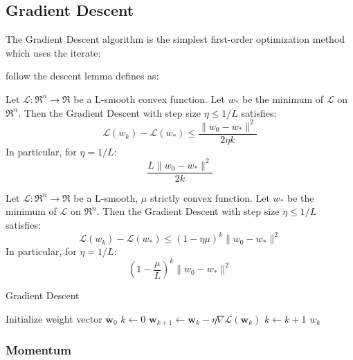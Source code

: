 \subsection{Gradient Descent}

The Gradient Descent algorithm is the simplest first-order optimization method which uses the iterate:



follow the descent lemma defines as:



\begin{theorem}
Let $\mathcal{L}: \Re^{n} \rightarrow \Re$ be a L-smooth convex function. Let $w_*$ be the minimum of $\mathcal{L}$ on $\Re^{n}$. Then the Gradient Descent with step size $\eta \leq 1/L$ satisfies:
$$
\mathcal{L}(w_k) - \mathcal{L}(w_*) \leq \frac{\| w_0 - w_* \|^2}{2 \eta k}
$$
In particular, for $\eta = 1/L$:
$$
\frac{L \| w_0 - w_* \|^2}{2 k}
$$
\end{theorem}



\begin{theorem}
Let $\mathcal{L}: \Re^{n} \rightarrow \Re$ be a L-smooth, $\mu$ strictly convex function. Let $w_*$ be the minimum of $\mathcal{L}$ on $\Re^{n}$. Then the Gradient Descent with step size $\eta \leq 1/L$ satisfies:
$$
\mathcal{L}(w_k) - \mathcal{L}(w_*) \leq (1 - \eta \mu)^k \| w_0 - w_* \|^2
$$
In particular, for $\eta = 1/L$:
$$
(1 - \frac{\mu}{L})^k \| w_0 - w_* \|^2
$$
\end{theorem}

\begin{algorithm}[H]
	\caption{Gradient Descent}
	\label{alg:gd}
	\begin{algorithmic}
			\State Initialize weight vector $\textbf{w}_0$
			\State $k \gets 0$
				\State $\textbf{w}_{k+1} \gets \textbf{w}_k - \eta \nabla \mathcal{L}(\textbf{w}_k)$
				\State $k \gets k + 1$
			\EndWhile
			\State \Return $w_k$
		\EndFunction
	\end{algorithmic}
\end{algorithm}

\subsubsection{Momentum}



